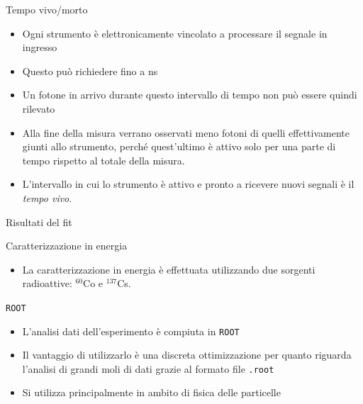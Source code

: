 \documentclass [xcolor=svgnames] {beamer}
\begin{document}
\begin{frame}{Tempo vivo/morto}
	\begin{itemize}
		\item Ogni strumento è elettronicamente vincolato a processare il segnale in ingresso
		\item Questo può richiedere fino a ns
		\item Un fotone in arrivo durante questo intervallo di tempo non può essere quindi rilevato
		\item Alla fine della misura verrano osservati meno fotoni di quelli effettivamente giunti allo strumento, perché quest'ultimo è attivo solo per una parte di tempo rispetto al totale della misura.
		\item L'intervallo in cui lo strumento è attivo e pronto a ricevere nuovi segnali è il \emph{tempo vivo}.
	\end{itemize}
\end{frame}
\begin{frame}{Risultati del fit}
	\begin{table}[ht]
		\centering
	\end{table}
\end{frame}	

\begin{frame}{Caratterizzazione in energia}
	\begin{itemize}
			\item La caratterizzazione in energia è effettuata utilizzando due sorgenti radioattive: $^{60}$Co e $^{137}$Cs.
		\end{itemize}
\end{frame}

\begin{frame}{\texttt{ROOT}}
	\begin{itemize}
		\item L'analisi dati dell'esperimento è compiuta in \texttt{ROOT}
		\item Il vantaggio di utilizzarlo è una discreta ottimizzazione per quanto riguarda l'analisi di grandi moli di dati grazie al formato file \texttt{.root}
		\item Si utilizza principalmente in ambito di fisica delle particelle
	\end{itemize}
\end{frame}
\end{document}
